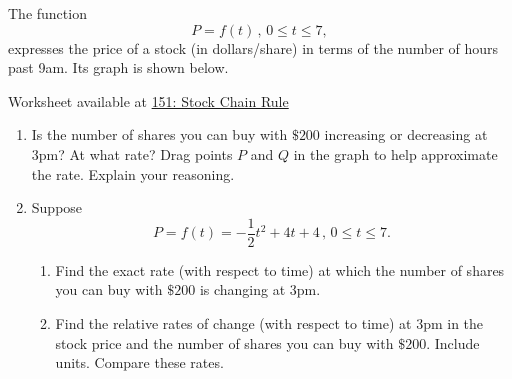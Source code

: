 \documentclass{ximera}
\begin{document}
\begin{question}  \label{Q9dfFRFrfddf}
The function 
\[
   P = f(t) \, , \, 0\leq t \leq 7 ,
\]
expresses the price of a stock (in dollars/share) in terms of the number of hours past 9am. Its graph is shown below.


\begin{onlineOnly}
    \begin{center}
\end{center}
\end{onlineOnly}

Worksheet available at \href{https://www.desmos.com/calculator/0yv49behlw}{151: Stock Chain Rule} 

\begin{enumerate}
\item Is the number of shares you can buy with $\$200$ increasing or decreasing at 3pm? At what rate? Drag points $P$ and $Q$ in the graph to help approximate the rate. Explain your reasoning.

\item Suppose
\[
   P = f(t) = -\frac{1}{2}t^2 + 4t + 4 \, , \, 0\leq t \leq 7.
\]

\begin{enumerate}
\item Find the exact rate (with respect to time) at which the number of shares you can buy with $\$200$ is changing at 3pm. 

\item Find the relative rates of change (with respect to time) at 3pm in the stock price and the number of shares you can buy with $\$200$. Include units. Compare these rates.
\end{enumerate}
\end{enumerate}
\end{question}
\end{document}
